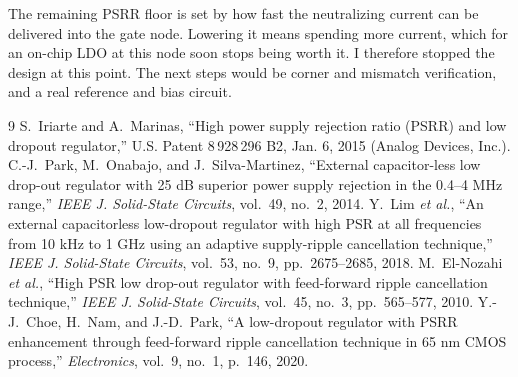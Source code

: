 \documentclass[conference]{IEEEtran}
\begin{document}
The remaining PSRR floor is set by how fast the neutralizing current can be delivered into the gate node. Lowering it means spending more current, which for an on-chip LDO at this node soon stops being worth it. I therefore stopped the design at this point. The next steps would be corner and mismatch verification, and a real reference and bias circuit.

\begin{thebibliography}{9}
 S.~Iriarte and A.~Marinas, ``High power supply rejection ratio (PSRR) and low dropout regulator,'' U.S. Patent 8\,928\,296 B2, Jan. 6, 2015 (Analog Devices, Inc.).
 C.-J.~Park, M.~Onabajo, and J.~Silva-Martinez, ``External capacitor-less low drop-out regulator with 25 dB superior power supply rejection in the 0.4--4 MHz range,'' \emph{IEEE J. Solid-State Circuits}, vol.~49, no.~2, 2014.
 Y.~Lim \emph{et al.}, ``An external capacitorless low-dropout regulator with high PSR at all frequencies from 10 kHz to 1 GHz using an adaptive supply-ripple cancellation technique,'' \emph{IEEE J. Solid-State Circuits}, vol.~53, no.~9, pp.~2675--2685, 2018.
 M.~El-Nozahi \emph{et al.}, ``High PSR low drop-out regulator with feed-forward ripple cancellation technique,'' \emph{IEEE J. Solid-State Circuits}, vol.~45, no.~3, pp.~565--577, 2010.
 Y.-J.~Choe, H.~Nam, and J.-D.~Park, ``A low-dropout regulator with PSRR enhancement through feed-forward ripple cancellation technique in 65 nm CMOS process,'' \emph{Electronics}, vol.~9, no.~1, p.~146, 2020.
\end{thebibliography}
\end{document}
